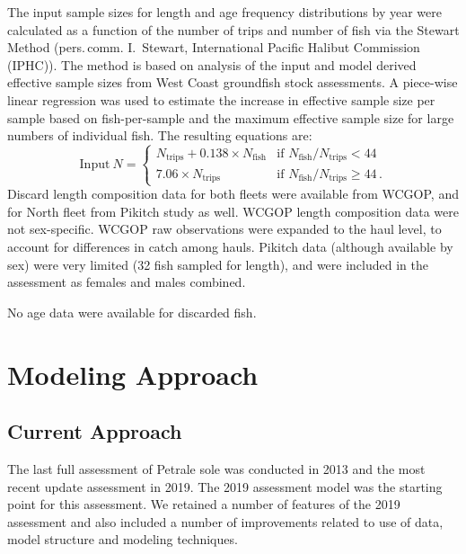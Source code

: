 \documentclass[
]{scrartcl}
\begin{document}
The input sample sizes for length and age frequency distributions by
year were calculated as a function of the number of trips and number of
fish via the Stewart Method (pers.\,comm. I.\ Stewart, International
Pacific Halibut Commission (IPHC)). The method is based on analysis of
the input and model derived effective sample sizes from West Coast
groundfish stock assessments. A piece-wise linear regression was used to
estimate the increase in effective sample size per sample based on
fish-per-sample and the maximum effective sample size for large numbers
of individual fish. The resulting equations are:
%
\def\Nfish{\ensuremath{N_{\mathrm{fish}}}}
\def\Ntrips{\ensuremath{N_{\mathrm{trips}}}}
\[
%
%
\mathrm{Input\ }N = \begin{cases}
 \Ntrips + 0.138 \times \Nfish & \text{if  }\Nfish/\Ntrips < 44\\  
 7.06 \times \Ntrips & \text{if  } \Nfish/\Ntrips \geq 44\,.
 \end{cases}
\]
%
Discard length composition data for both fleets were available from
WCGOP, and for North fleet from Pikitch study as well. WCGOP length
composition data were not sex-specific. WCGOP raw observations were
expanded to the haul level, to account for differences in catch among
hauls. Pikitch data (although available by sex) were very limited (32
fish sampled for length), and were included in the assessment as females
and males combined.

No age data were available for discarded fish.

\newpage{}

\section{Modeling Approach}\label{sec-modeling-approach}

\subsection{Current Approach}\label{sec-current-approach}

The last full assessment of Petrale sole was conducted in 2013 and the
most recent update assessment in 2019. The 2019 assessment model was the
starting point for this assessment. We retained a number of features of
the 2019 assessment and also included a number of improvements related
to use of data, model structure and modeling techniques.
\end{document}

